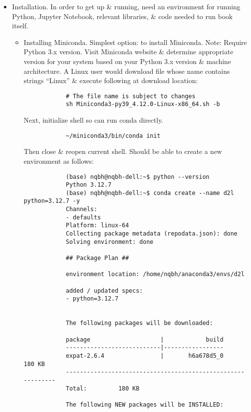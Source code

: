 \documentclass{article}
\begin{document}
\begin{itemize}
\begin{itemize}
\begin{itemize}
		\end{itemize}
	\end{itemize}
	\item {\sf Installation.} In order to get up \& running, need an environment for running Python, Jupyter Notebook, relevant libraries, \& code needed to run book itself.
	\begin{itemize}
		\item {\sf Installing Miniconda.} Simplest option: to install Miniconda. Note: Require Python 3.x version. Visit Miniconda website \& determine appropriate version for your system based on your Python 3.x version \& machine architecture. A Linux user would download file whose name contains strings ``Linux'' \& execute following at download location:
		\begin{verbatim}
			# The file name is subject to changes
			sh Miniconda3-py39_4.12.0-Linux-x86_64.sh -b
		\end{verbatim}
		Next, initialize shell so can run conda directly.
		\begin{verbatim}
			~/miniconda3/bin/conda init
		\end{verbatim}
		Then close \& reopen current shell. Should be able to create a new environment as follows:
		\begin{verbatim}
			(base) nqbh@nqbh-dell:~$ python --version
			Python 3.12.7
			(base) nqbh@nqbh-dell:~$ conda create --name d2l python=3.12.7 -y
			Channels:
			- defaults
			Platform: linux-64
			Collecting package metadata (repodata.json): done
			Solving environment: done
			
			## Package Plan ##
			
			environment location: /home/nqbh/anaconda3/envs/d2l
			
			added / updated specs:
			- python=3.12.7
			
			
			The following packages will be downloaded:
			
			package                    |            build
			---------------------------|-----------------
			expat-2.6.4                |       h6a678d5_0         180 KB
			------------------------------------------------------------
			Total:         180 KB
			
			The following NEW packages will be INSTALLED:
			

\end{verbatim}
\end{itemize}
\end{itemize}
\end{document}
